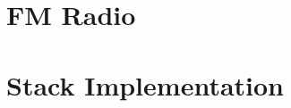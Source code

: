 \documentclass{report}
\begin{document}
	\section{FM Radio}
	\startsection
	\closesection
	
	\section{Stack Implementation}
	\startsection
	\closesection
\end{document}
